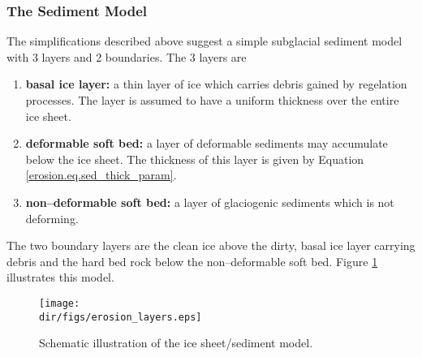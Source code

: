 \subsubsection{The Sediment Model}
The simplifications described above suggest a simple subglacial sediment model with 3 layers and 2 boundaries. The 3 layers are
\begin{enumerate}
\item \textbf{basal ice layer:} a thin layer of ice which carries debris gained
by regelation processes. The layer is assumed to have a uniform thickness over the entire ice sheet.
\item \textbf{deformable soft bed:} a layer of deformable sediments may accumulate below the ice sheet. The thickness of this layer is given by Equation \eqref{erosion.eq.sed_thick_param}.
\item \textbf{non--deformable soft bed:} a layer of glaciogenic sediments which is not deforming.
\end{enumerate}
The two boundary layers are the clean ice above the dirty, basal ice layer carrying debris and the hard bed rock below the non--deformable soft bed. Figure \ref{erosion.fig.ice_sed_model} illustrates this model.

\begin{figure}[htbp]
  \centering
  \texttt{[image: \\dir/figs/erosion\_layers.eps]}
  \caption{Schematic illustration of the ice sheet/sediment model.}
  \label{erosion.fig.ice_sed_model}
\end{figure}

